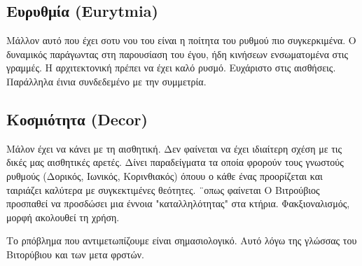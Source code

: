   \subsection{Ευρυθμία (Eurytmia)}
  
  Μάλλον αυτό που έχει σοτυ νου του είναι η ποίτητα του ρυθμού πιο συγκερκιμένα. Ο δυναμικός παράγωντας στη παρουσίαση του έγου, ήδη κινήσεων ενσωματομένα στις γραμμές. Η αρχιτεκτονική πρέπει να έχει καλό ρυσμό. Ευχάριστο στις αισθήσεις. Παράλληλα έινια συνδεδεμένο με την  συμμετρία.
  
  \subsection{Κοσμιότητα (Decor)}
  
  Μάλον έχει να κάνει με τη  αισθητική. Δεν φαίνεται να έχει ιδιαίτερη σχέση με τις δικές μας αισθητικές αρετές.
  Δίνει παραδείγματα τα οποία φρορούν τους γνωστούς ρυθμούς (Δορικός, Ιωνικός, Κορινθιακός) όπουυ ο κάθε ένας προορίζεται και ταιριάζει καλύτερα με συγκεκτιμένες θεότητες.
  ¨οπως φαίνεται Ο Βιτρούβιος προσπαθεί να προσδώσει μια έννοια "καταλληλότητας" στα κτήρια. Φακξιοναλισμός, μορφή ακολουθεί τη χρήση.
  
  Το ρπόβλημα που αντιμετωπίζουμε είναι σημασιολογικό. Αυτό λόγω της γλώσσας του Βιτορύβιου και των μετα φρστών.
